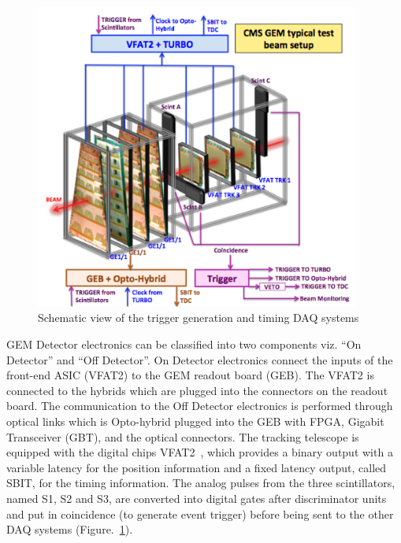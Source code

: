 \begin{figure}[!htbp]
\centering
\includegraphics[width=0.95\textwidth]{figures/GEM/tb_exptsetup.png}
\caption{Schematic view of the trigger generation and timing DAQ systems}\label{fig:daq}
\end{figure}
GEM Detector electronics can be classified into two components viz. ``On Detector'' and ``Off Detector''.
On Detector electronics connect the inputs of the front-end ASIC (VFAT2) to the GEM readout board (GEB). The VFAT2 is connected to the hybrids which are plugged into the connectors on the readout board.  The communication to the Off Detector electronics is performed through optical links which is Opto-hybrid plugged into the GEB with FPGA, Gigabit Transceiver (GBT), and the optical connectors.
The tracking telescope is equipped with the digital chips VFAT2~\cite{Aspell:2008zz}, which provides a binary output with a variable latency for the position information and a fixed latency output, called SBIT, for the timing information.
The analog pulses from the three scintillators, named S1, S2 and S3, are converted into digital gates after discriminator units and put in coincidence (to generate event trigger) before being sent to the other DAQ systems (Figure.~\ref{fig:daq}).
